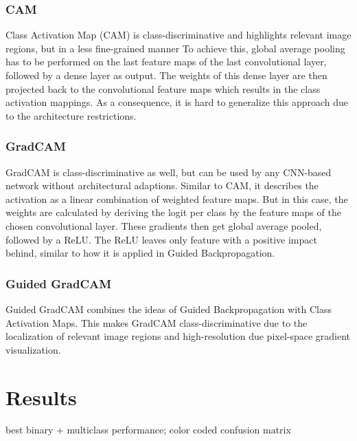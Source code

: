 \documentclass{article}
\begin{document}
\subsubsection{CAM}
Class Activation Map (CAM) is class-discriminative and highlights relevant image regions, but in a less fine-grained manner
To achieve this, global average pooling has to be performed on the last feature maps of the last convolutional layer, followed by a dense layer as output.
The weights of this dense layer are then projected back to the convolutional feature maps which results in the class activation mappings.
As a consequence, it is hard to generalize this approach due to the architecture restrictions.
\subsubsection{GradCAM}
GradCAM is class-discriminative as well, but can be used by any CNN-based network without architectural adaptions.
Similar to CAM, it describes the activation as a linear combination of weighted feature maps. But in this case, the weights are calculated
by deriving the logit per class by the feature maps of the chosen convolutional layer. These gradients then get global average pooled, followed by a ReLU.
The ReLU leaves only feature with a positive impact behind, similar to how it is applied in Guided Backpropagation.
\subsubsection{Guided GradCAM}
Guided GradCAM combines the ideas of Guided Backpropagation with Class Activation Maps.
This makes GradCAM class-discriminative due to the localization of relevant image regions and high-resolution due pixel-space gradient visualization.


\section{Results}
best binary + multiclass performance;
color coded confusion matrix

\end{document}
